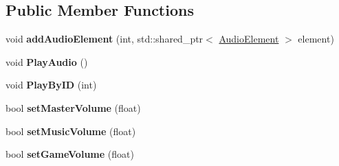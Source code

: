 \subsection*{Public Member Functions}
\begin{DoxyCompactItemize}
\item 
void {\bfseries add\+Audio\+Element} (int, std\+::shared\+\_\+ptr$<$ \hyperlink{class_i_o_1_1_audio_1_1_audio_element}{Audio\+Element} $>$ element)\hypertarget{class_i_o_1_1_audio_1_1_audio_ab94ccbb6449e5c67b79af089ce675e3d}{}\label{class_i_o_1_1_audio_1_1_audio_ab94ccbb6449e5c67b79af089ce675e3d}

\item 
void {\bfseries Play\+Audio} ()\hypertarget{class_i_o_1_1_audio_1_1_audio_a47f7812040aef0d2f660cad5464d030a}{}\label{class_i_o_1_1_audio_1_1_audio_a47f7812040aef0d2f660cad5464d030a}

\item 
void {\bfseries Play\+By\+ID} (int)\hypertarget{class_i_o_1_1_audio_1_1_audio_aa7322292671539512a6d8eec3908a029}{}\label{class_i_o_1_1_audio_1_1_audio_aa7322292671539512a6d8eec3908a029}

\item 
bool {\bfseries set\+Master\+Volume} (float)\hypertarget{class_i_o_1_1_audio_1_1_audio_abc127574c67bd014fce4e4ec9f86002b}{}\label{class_i_o_1_1_audio_1_1_audio_abc127574c67bd014fce4e4ec9f86002b}

\item 
bool {\bfseries set\+Music\+Volume} (float)\hypertarget{class_i_o_1_1_audio_1_1_audio_a4bd5a3dfbcd8f5f6af8e067ecc535791}{}\label{class_i_o_1_1_audio_1_1_audio_a4bd5a3dfbcd8f5f6af8e067ecc535791}

\item 
bool {\bfseries set\+Game\+Volume} (float)\hypertarget{class_i_o_1_1_audio_1_1_audio_a57e02f1b176f94707ed7704b1d9e348a}{}\label{class_i_o_1_1_audio_1_1_audio_a57e02f1b176f94707ed7704b1d9e348a}

\end{DoxyCompactItemize}
